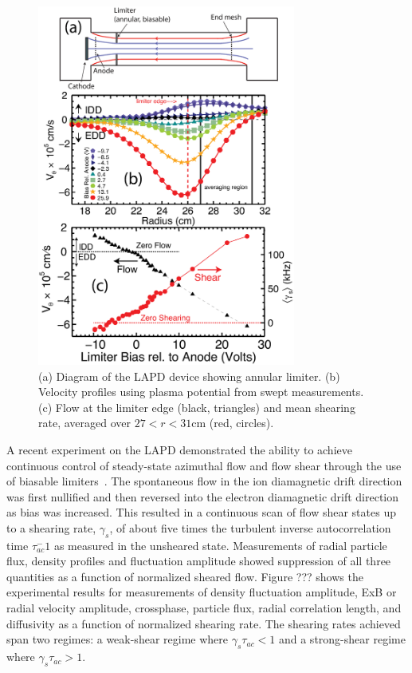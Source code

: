 \documentclass[aip,pop,amsmath,amssymb,reprint,superscriptaddress]{revtex4-1} %
\begin{document}
\begin{figure}[!htbp]
\centerline{
\includegraphics[width=8.5cm]{figure1.eps}}
\caption{\label{fig:velocity_flowshear} (a) Diagram of the LAPD device showing annular limiter.  (b) Velocity profiles using plasma potential from swept measurements. (c) Flow at the limiter edge (black, triangles) and mean shearing rate, averaged over $27 < r < 31$cm (red, circles).}
\end{figure}

A recent experiment on the LAPD demonstrated the ability to achieve continuous control of steady-state azimuthal flow and flow shear through the use of biasable limiters~\cite{schaffner12}. The spontaneous flow in the ion diamagnetic drift direction was first nullified and then reversed into the electron diamagnetic drift direction as bias was increased. This resulted in a continuous scan of flow shear states up to a shearing rate, $\gamma_s$, of about five times the turbulent inverse autocorrelation time  $\tau_{ac}^-1$ as measured in the unsheared state. Measurements of radial particle flux, density profiles and fluctuation amplitude showed suppression of all three quantities as a function of normalized sheared flow. Figure ??? shows the experimental results for measurements of density fluctuation amplitude, ExB or radial velocity amplitude, crossphase, particle flux, radial correlation length, and diffusivity as a function of normalized shearing rate. The shearing rates achieved span two regimes: a weak-shear regime where $\gamma_{s}\tau_{ac} < 1$ and a strong-shear regime where $\gamma_{s}\tau_{ac} > 1$.
\end{document}
